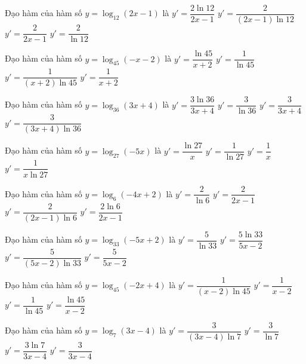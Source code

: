 \documentclass[12pt,a4paper]{article}
\begin{document}
\begin{ex}
Đạo hàm của hàm số $y=\log_{12}(2x-1)$ là
\choice
{$y'=\dfrac{2\ln{12}}{2x-1}$}
{\True $y'=\dfrac{2}{(2x-1)\ln 12}$}
{$y'=\dfrac{2}{2x-1}$}
{$y'=\dfrac{2}{\ln{12}}$}
\end{ex}
\begin{ex}
Đạo hàm của hàm số $y=\log_{45}(-x-2)$ là
\choice
{$y'=\dfrac{\ln{45}}{x+2}$}
{$y'=\dfrac{1}{\ln{45}}$}
{\True $y'=\dfrac{1}{(x+2)\ln 45}$}
{$y'=\dfrac{1}{x+2}$}
\end{ex}
\begin{ex}
Đạo hàm của hàm số $y=\log_{36}(3x+4)$ là
\choice
{$y'=\dfrac{3\ln{36}}{3x+4}$}
{$y'=\dfrac{3}{\ln{36}}$}
{$y'=\dfrac{3}{3x+4}$}
{\True $y'=\dfrac{3}{(3x+4)\ln 36}$}
\end{ex}
\begin{ex}
Đạo hàm của hàm số $y=\log_{27}(-5x)$ là
\choice
{$y'=\dfrac{\ln{27}}{x}$}
{$y'=\dfrac{1}{\ln{27}}$}
{$y'=\dfrac{1}{x}$}
{\True $y'=\dfrac{1}{x\ln 27}$}
\end{ex}
\begin{ex}
Đạo hàm của hàm số $y=\log_6(-4x+2)$ là
\choice
{$y'=\dfrac{2}{\ln{6}}$}
{$y'=\dfrac{2}{2x-1}$}
{\True $y'=\dfrac{2}{(2x-1)\ln 6}$}
{$y'=\dfrac{2\ln{6}}{2x-1}$}
\end{ex}
\begin{ex}
Đạo hàm của hàm số $y=\log_{33}(-5x+2)$ là
\choice
{$y'=\dfrac{5}{\ln{33}}$}
{$y'=\dfrac{5\ln{33}}{5x-2}$}
{\True $y'=\dfrac{5}{(5x-2)\ln 33}$}
{$y'=\dfrac{5}{5x-2}$}
\end{ex}
\begin{ex}
Đạo hàm của hàm số $y=\log_{45}(-2x+4)$ là
\choice
{\True $y'=\dfrac{1}{(x-2)\ln 45}$}
{$y'=\dfrac{1}{x-2}$}
{$y'=\dfrac{1}{\ln{45}}$}
{$y'=\dfrac{\ln{45}}{x-2}$}
\end{ex}
\begin{ex}
Đạo hàm của hàm số $y=\log_7(3x-4)$ là
\choice
{\True $y'=\dfrac{3}{(3x-4)\ln 7}$}
{$y'=\dfrac{3}{\ln{7}}$}
{$y'=\dfrac{3\ln{7}}{3x-4}$}
{$y'=\dfrac{3}{3x-4}$}
\end{ex}
\end{document}
